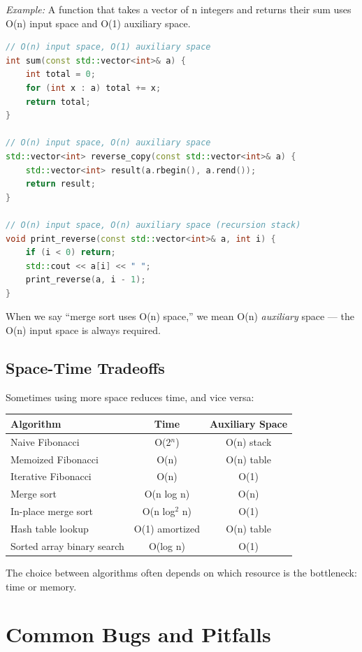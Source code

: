 \textit{Example:} A function that takes a vector of n integers and returns their sum uses O(n) input space and O(1) auxiliary space.

\begin{lstlisting}[language=C++]
// O(n) input space, O(1) auxiliary space
int sum(const std::vector<int>& a) {
    int total = 0;
    for (int x : a) total += x;
    return total;
}

// O(n) input space, O(n) auxiliary space
std::vector<int> reverse_copy(const std::vector<int>& a) {
    std::vector<int> result(a.rbegin(), a.rend());
    return result;
}

// O(n) input space, O(n) auxiliary space (recursion stack)
void print_reverse(const std::vector<int>& a, int i) {
    if (i < 0) return;
    std::cout << a[i] << " ";
    print_reverse(a, i - 1);
}
\end{lstlisting}

When we say ``merge sort uses O(n) space,'' we mean O(n) \textit{auxiliary} space — the O(n) input space is always required.

\subsection{Space-Time Tradeoffs}

Sometimes using more space reduces time, and vice versa:

\begin{center}
\begin{tabular}{lcc}
\toprule
Algorithm & Time & Auxiliary Space \\
\midrule
Naive Fibonacci & O(2$^{n}$) & O(n) stack \\
Memoized Fibonacci & O(n) & O(n) table \\
Iterative Fibonacci & O(n) & O(1) \\
Merge sort & O(n log n) & O(n) \\
In-place merge sort & O(n log$^{2}$ n) & O(1) \\
Hash table lookup & O(1) amortized & O(n) table \\
Sorted array binary search & O(log n) & O(1) \\
\bottomrule
\end{tabular}
\end{center}

The choice between algorithms often depends on which resource is the bottleneck: time or memory.

\section{Common Bugs and Pitfalls}

